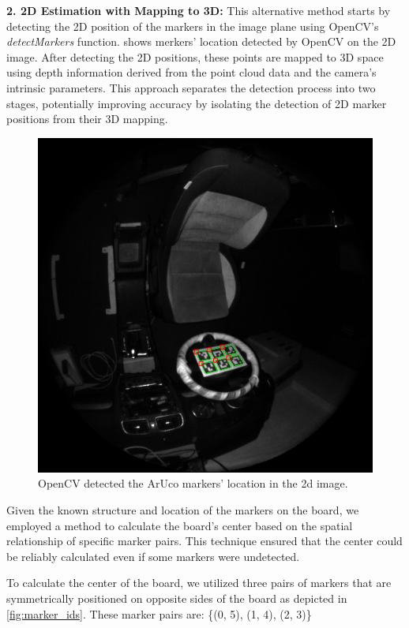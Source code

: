 \textbf{2. 2D Estimation with Mapping to 3D: }
This alternative method starts by detecting the 2D position of 
the markers in the image plane using OpenCV’s \emph{detectMarkers} 
function.  shows merkers' location detected 
by OpenCV on the 2D image.
After detecting the 2D positions, these points are 
mapped to 3D space using depth information derived from the 
point cloud data and the camera’s intrinsic parameters. 
This approach separates the detection process into two stages, 
potentially improving accuracy by isolating the detection of 
2D marker positions from their 3D mapping.
\begin{figure}[ht]
    \centering
    \includegraphics[scale=0.5]{media/chapter 5/aruco_detection.png}
    \caption{OpenCV detected the ArUco markers' location in the 2d image.}
    \label{fig:detectMarkers}
\end{figure}


Given the known structure and location of the markers on the board, 
we employed a method to calculate the board’s center based on the 
spatial relationship of specific marker pairs. This technique ensured 
that the center could be reliably calculated even if some markers were 
undetected.

To calculate the center of the board, we utilized three pairs of markers 
that are symmetrically positioned on opposite sides of the board as depicted
in \cref{fig:marker_ids}. These marker pairs are: \{(0, 5), (1, 4), (2, 3)\}

